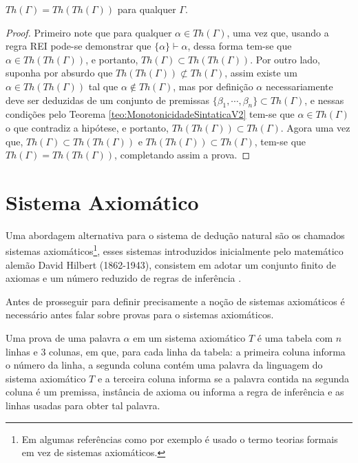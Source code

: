 \begin{theorem}\label{teo:PontoFixo}
    $Th(\Gamma) = Th(Th(\Gamma))$ para qualquer $\Gamma$.
\end{theorem}

\begin{proof}
  Primeiro note que para qualquer $\alpha \in Th(\Gamma)$, uma vez que, usando a regra REI pode-se demonstrar que $\{\alpha\} \vdash \alpha$, dessa forma tem-se que $\alpha \in Th(Th(\Gamma))$, e portanto, $Th(\Gamma) \subset Th(Th(\Gamma))$. Por outro lado, suponha por absurdo que $Th(Th(\Gamma)) \not\subset Th(\Gamma)$, assim existe um $\alpha \in Th(Th(\Gamma))$ tal que $\alpha \not\in Th(\Gamma)$, mas por definição $\alpha$ necessariamente deve ser deduzidas de um conjunto de premissas $\{\beta_1, \cdots, \beta_n\} \subset Th(\Gamma)$, e nessas condições pelo Teorema \ref{teo:MonotonicidadeSintaticaV2} tem-se que $\alpha \in Th(\Gamma)$ o que contradiz a hipótese, e portanto, $Th(Th(\Gamma)) \subset Th(\Gamma)$. Agora uma vez que, $Th(\Gamma) \subset Th(Th(\Gamma))$ e $Th(Th(\Gamma)) \subset Th(\Gamma)$, tem-se que $Th(\Gamma) = Th(Th(\Gamma))$, completando assim a prova.
\end{proof}

\section{Sistema Axiomático}\label{sec:SistemaAxiomatico}

Uma abordagem alternativa para o sistema de dedução natural são os chamados sistemas axiomáticos\footnote{Em algumas referências como por exemplo \cite{BenjaV1, leonidas2002} é usado o termo teorias formais em vez de sistemas axiomáticos.}, esses sistemas introduzidos inicialmente pelo matemático alemão David Hilbert (1862-1943), consistem em adotar um conjunto finito de axiomas e um número reduzido de regras de inferência \cite{joaoPavao2014, sernadas2006}.

Antes de prosseguir para definir precisamente a noção de sistemas axiomáticos é necessário antes falar sobre provas para o sistemas axiomáticos.

\begin{definition}\label{def:ProvaAxiomatica}
    \cite{leonidas2002} Uma prova de uma palavra $\alpha$ em um sistema axiomático $T$ é uma tabela com $n$ linhas e $3$ colunas, em que, para cada linha da tabela: a primeira coluna informa o número da linha, a segunda coluna contém uma palavra da linguagem do sistema axiomático $T$ e a terceira coluna informa se a palavra contida na segunda coluna é um premissa, instância de axioma ou informa a regra de inferência e as linhas usadas para obter tal palavra. 
\end{definition}

